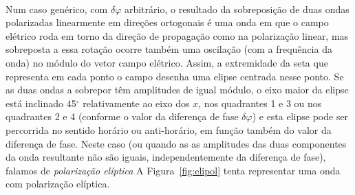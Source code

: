 \begin{description}[leftmargin=0pt,labelindent=0pt]
\item[Caso genérico, $\bm{\delta\varphi}$ qualquer]\hfill\\
Num caso genérico, com $\delta\varphi$ arbitrário, o resultado da sobreposição
de duas ondas polarizadas linearmente em direções ortogonais é uma onda em que o
campo elétrico roda em torno da direção de propagação como na polarização
linear, mas sobreposta a essa rotação ocorre também uma oscilação (com a
frequência da onda) no módulo do vetor campo elétrico. Assim, a extremidade da
seta que representa em cada ponto o campo desenha uma elipse centrada nesse
ponto. Se as duas ondas a sobrepor têm amplitudes de igual módulo, o eixo maior
da elipse está inclinado 45$^\circ$ relativamente ao eixo dos $x$, nos
quadrantes 1 e 3 ou nos quadrantes 2 e 4 (conforme o valor da diferença de fase
$\delta\varphi$) e esta elipse pode ser percorrida no sentido horário ou
anti-horário, em função também do valor da diferença de fase. Neste caso (ou
quando as as amplitudes das duas componentes da onda resultante não são iguais,
independentemente da diferença de fase), falamos de \emph{polarização elíptica}
A Figura~\ref{fig:elipol} tenta representar uma onda com polarização elíptica.
\begin{figure}[htb]
{\centering
\def\zangle{210}
\def\xangle{-10}
}
\end{figure}
\end{description}

